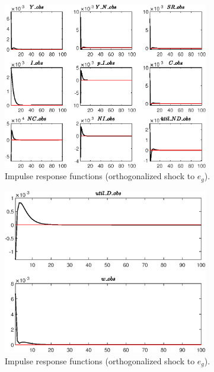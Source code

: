  
\begin{figure}[H]
\centering 
\includegraphics[width=0.80\textwidth]{RBC_sectoral/graphs/RBC_sectoral_IRF_e_g1}
\caption{Impulse response functions (orthogonalized shock to ${e_g}$).}\label{Fig:IRF:e_g:1}
\end{figure}
 
\begin{figure}[H]
\centering 
\includegraphics[width=0.80\textwidth]{RBC_sectoral/graphs/RBC_sectoral_IRF_e_g2}
\caption{Impulse response functions (orthogonalized shock to ${e_g}$).}\label{Fig:IRF:e_g:2}
\end{figure}
 
